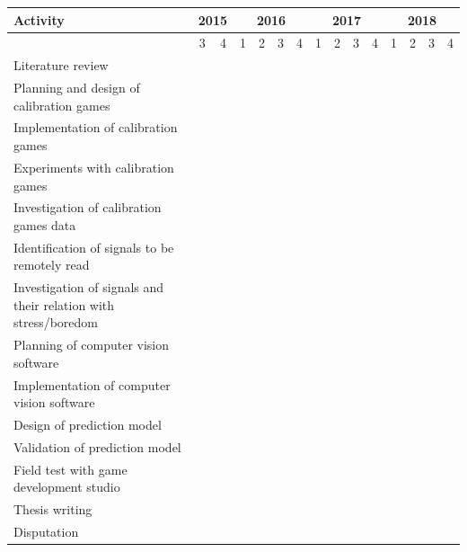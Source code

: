 \begin{landscape}

\begin{center}
\begin{tabular}{ |p{6.5cm}|c|c|c|c|c|c|c|c|c|c|c|c|c|c| }
\hline
\textbf{Activity} & \multicolumn{2}{|c|}{2015} & \multicolumn{4}{|c|}{2016} & \multicolumn{4}{|c|}{2017} & \multicolumn{4}{|c|}{2018} \\
\hline
 & 3 & 4 & 1 & 2 & 3 & 4 & 1 & 2 & 3 & 4 & 1 & 2 & 3 & 4 \\
\hline
Literature review & \cellcolor{Gray} & \cellcolor{Gray} & \cellcolor{Gray} & \cellcolor{Gray} & \cellcolor{Gray} & \cellcolor{Gray} &  &  &  &  &  &  &  &  \\
\hline
Planning and design of calibration games &  &  & \cellcolor{Gray} & \cellcolor{Gray} &  &  &  &  &  &  &  &  &  &  \\
\hline
Implementation of calibration games &  &  &  & \cellcolor{Gray} & \cellcolor{Gray} &  &  &  &  &  &  &  &  &  \\
\hline
Experiments with calibration games &  &  &  & \cellcolor{Gray} & \cellcolor{Gray} &  &  &  &  &  &  &  &  &  \\
\hline
Investigation of calibration games data &  &  &  &  & \cellcolor{Gray} & \cellcolor{Gray} &  &  &  &  &  &  &  &  \\
\hline
Identification of signals to be remotely read &  &  &  &  &  & \cellcolor{Gray} & \cellcolor{Gray} &  &  &  &  &  &  &  \\
\hline
Investigation of signals and their relation with stress/boredom &  &  &  &  &  &  & \cellcolor{Gray} & \cellcolor{Gray} &  &  &  &  &  &  \\
\hline
Planning of computer vision software &  &  &  &  &  &  &  & \cellcolor{Gray} &  &  &  &  &  &  \\
\hline
Implementation of computer vision software &  &  &  &  &  &  &  &  & \cellcolor{Gray} & \cellcolor{Gray} &  &  &  &  \\
\hline
Design of prediction model &  &  &  &  &  &  &  & \cellcolor{Gray} & \cellcolor{Gray} & \cellcolor{Gray} &  &  &  &  \\
\hline
Validation of prediction model &  &  &  &  &  &  &  &  &  &  & \cellcolor{Gray} & \cellcolor{Gray} &  &  \\
\hline
Field test with game development studio &  &  &  &  &  &  &  &  &  &  &  & \cellcolor{Gray} &  &  \\
\hline
Thesis writing &  &  &  &  &  &  &  & \cellcolor{Gray} & \cellcolor{Gray} & \cellcolor{Gray} & \cellcolor{Gray} & \cellcolor{Gray} & \cellcolor{Gray} &  \\
\hline
Disputation &  &  &  &  &  &  &  &  &  &  &  &  &  & \cellcolor{Gray} \\
\hline
\hline
\end{tabular}
\end{center}

\end{landscape}


